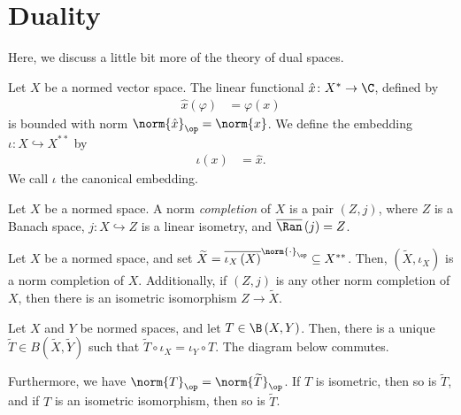\section{Duality}%
Here, we discuss a little bit more of the theory of dual spaces.
\begin{definition}\label{def:double_dual_and_canonical_embedding}
  Let $X$ be a normed vector space. The linear functional $\hat{x}\colon X^{\ast}\rightarrow \C$, defined by
  \begin{align*}
    \hat{x}(\varphi) &= \varphi(x)
  \end{align*}
  is bounded with norm $\norm{\hat{x}}_{\op} = \norm{x}$. We define the embedding $\iota\colon X\hookrightarrow X^{\ast\ast}$ by
  \begin{align*}
    \iota(x) &= \hat{x}.
  \end{align*}
  We call $\iota$ the canonical embedding.
\end{definition}
\begin{definition}
  Let $X$ be a normed space. A norm \textit{completion} of $X$ is a pair $\left(Z,j\right)$, where $Z$ is a Banach space, $j\colon X\hookrightarrow Z$ is a linear isometry, and $\overline{\Ran}\left(j\right) = Z$.
\end{definition}
\begin{proposition}\label{prop:completion_existence}
  Let $X$ be a normed space, and set $\widetilde{X} = \overline{\iota_X\left(X\right)}^{\norm{\cdot}_{\op}}\subseteq X^{\ast\ast}$. Then, $\left(\widetilde{X},\iota_X\right)$ is a norm completion of $X$. Additionally, if $\left(Z,j\right)$ is any other norm completion of $X$, then there is an isometric isomorphism $Z\rightarrow \widetilde{X}$.
\end{proposition}
\begin{proposition}
  Let $X$ and $Y$ be normed spaces, and let $T\in \B\left(X,Y\right)$. Then, there is a unique $\widetilde{T}\in B\left(\widetilde{X},\widetilde{Y}\right)$ such that $\widetilde{T}\circ \iota_X = \iota_Y\circ T$. The diagram below commutes.
  \begin{center}
  \end{center}
  Furthermore, we have $\norm{T}_{\op} = \norm{\widetilde{T}}_{\op}$. If $T$ is isometric, then so is $\widetilde{T}$, and if $T$ is an isometric isomorphism, then so is $\widetilde{T}$.
\end{proposition}
